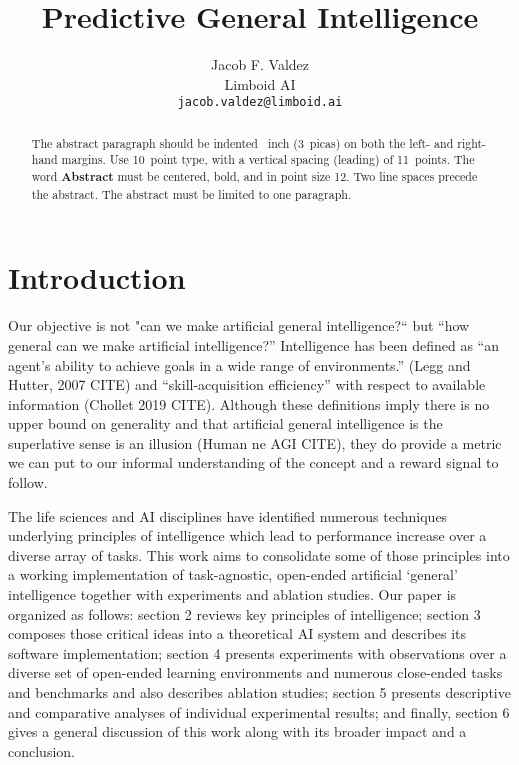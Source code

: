 \documentclass{article}
\title{Predictive General Intelligence}
\author{%
  Jacob F. Valdez \\
  Limboid AI \\
  \texttt{jacob.valdez@limboid.ai}
}
\begin{document}
\maketitle

\begin{abstract}
  The abstract paragraph should be indented ~inch (3~picas) on
  both the left- and right-hand margins. Use 10~point type, with a vertical
  spacing (leading) of 11~points.  The word \textbf{Abstract} must be centered,
  bold, and in point size 12. Two line spaces precede the abstract. The abstract
  must be limited to one paragraph.
\end{abstract}

\section{Introduction}

Our objective is not "can we make artificial general intelligence?`` but “how general can we make artificial intelligence?” Intelligence has been defined as “an agent’s ability to achieve goals in a wide range of environments.” (Legg and Hutter, 2007 CITE) and “skill-acquisition efficiency” with respect to available information (Chollet 2019 CITE). Although these definitions imply there is no upper bound on generality and that artificial general intelligence is the superlative sense is an illusion (Human ne AGI CITE), they do provide a metric we can put to our informal understanding of the concept and a reward signal to follow.

The life sciences and AI disciplines have identified numerous techniques underlying principles of intelligence which lead to performance increase over a diverse array of tasks. This work aims to consolidate some of those principles into a working implementation of task-agnostic, open-ended artificial ‘general’ intelligence together with experiments and ablation studies. Our paper is organized as follows: section 2 reviews key principles of intelligence; section 3 composes those critical ideas into a theoretical AI system and describes its software implementation; section 4 presents experiments with observations over a diverse set of open-ended learning environments and numerous close-ended tasks and benchmarks and also describes ablation studies; section 5 presents descriptive and comparative analyses of individual experimental results; and finally, section 6 gives a general discussion of this work along with its broader impact and a conclusion. 
\end{document}
